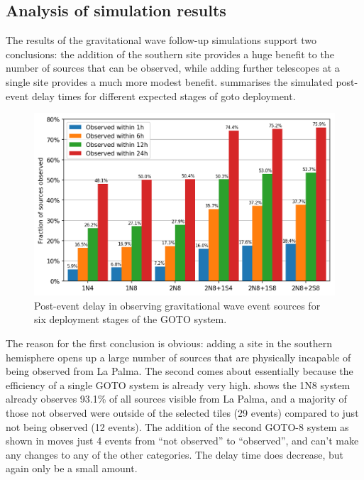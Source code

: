 \begin{colsection}
\begin{colsection}
\end{colsection}


\subsection{Analysis of simulation results}
\label{sec:gw_sim_analysis}
\begin{colsection}

The results of the gravitational wave follow-up simulations support two conclusions: the addition of the southern site provides a huge benefit to the number of sources that can be observed, while adding further telescopes at a single site provides a much more modest benefit.  summarises the simulated post-event delay times for different expected stages of \gls{goto} deployment.

\begin{figure}[t]
    \begin{center}
        \includegraphics[width=\linewidth]{images/gw_sims/results.png}
    \end{center}
    \caption[Simulation delay time for different GOTO systems]{
        Post-event delay in observing gravitational wave event sources for six deployment stages of the GOTO system.
    }\label{fig:gw_sim_results}
\end{figure}

The reason for the first conclusion is obvious: adding a site in the southern hemisphere opens up a large number of sources that are physically incapable of being observed from La Palma. The second comes about essentially because the efficiency of a single GOTO system is already very high.  shows the 1N8 system already observes 93.1\% of all sources visible from La Palma, and a majority of those not observed were outside of the selected tiles (29 events) compared to just not being observed (12 events). The addition of the second GOTO-8 system as shown in  moves just 4 events from ``not observed'' to ``observed'', and can't make any changes to any of the other categories. The delay time does decrease, but again only be a small amount.


\end{colsection}
\end{colsection}
